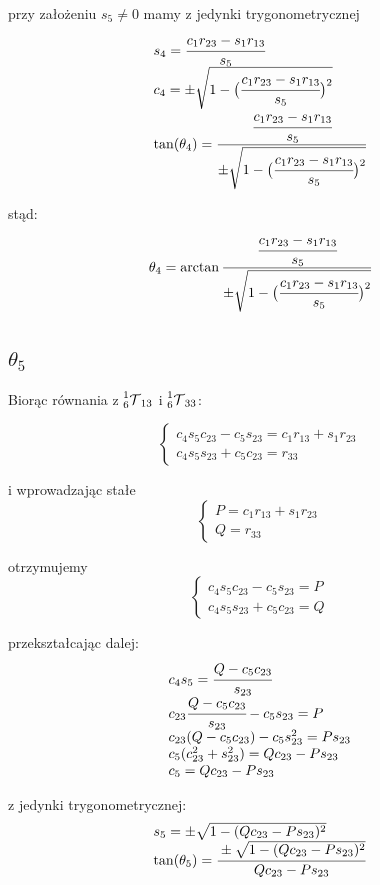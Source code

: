 \documentclass[]{article}
\newcommand\T{\mathcal{T}}
\begin{document}
przy założeniu $s_5 \neq 0$ mamy z jedynki trygonometrycznej
\[\begin{array}{l}
s_4 = \cfrac{c_1r_{23} - s_1r_{13}}{s_5} \\
c_4 = \pm \sqrt{1 - \big(\cfrac{c_1r_{23} - s_1r_{13}}{s_5}\big)^2} \\
\tan(\theta_4) = \cfrac{\cfrac{c_1r_{23} - s_1r_{13}}{s_5}}{\pm \sqrt{1 - \big(\cfrac{c_1r_{23} - s_1r_{13}}{s_5}\big)^2}}
\end{array}\]

stąd:
\[
\theta_4 = \arctan\cfrac{\cfrac{c_1r_{23} - s_1r_{13}}{s_5}}{\pm \sqrt{1 - \big(\cfrac{c_1r_{23} - s_1r_{13}}{s_5}\big)^2}}
\]

\subsection{$\theta_5$}
Biorąc równania z $\prescript{1}{6}{\T}_{13}$ i $\prescript{1}{6}{\T}_{33}$:

\[\left\{\begin{array}{l}
c_4s_5c_{23} - c_5s_{23} = c_1r_{13} + s_1r_{23} \\
c_4s_5s_{23} + c_5c_{23} = r_{33}
\end{array}\right.\]

i wprowadzając stałe
\[\left\{\begin{array}{l}
P = c_1r_{13} + s_1r_{23} \\
Q = r_{33}
\end{array}\right.\]

otrzymujemy
\[\left\{\begin{array}{l}
c_4s_5c_{23} - c_5s_{23} = P \\
c_4s_5s_{23} + c_5c_{23} = Q
\end{array}\right.\]

przekształcając dalej:
\[\begin{array}{l}
c_4s_5 = \cfrac{Q - c_5c_{23}}{s_{23}} \\
c_{23}\cfrac{Q - c_5c_{23}}{s_{23}} - c_5s_{23} = P \\
c_{23}(Q - c_5c_{23}) - c_5s_{23}^2 = Ps_{23} \\
c_5(c_{23}^2 + s_{23}^2) = Qc_{23} - Ps_{23} \\
c_5 = Qc_{23} - Ps_{23}
\end{array}\]

z jedynki trygonometrycznej:
\[\begin{array}{l}
s_5 = \pm \sqrt{1 - (Qc_{23} - Ps_{23})^2} \\
\tan(\theta_5) = \cfrac{\pm \sqrt{1 - (Qc_{23} - Ps_{23})^2}}{Qc_{23} - Ps_{23}}
\end{array}\]
\end{document}
